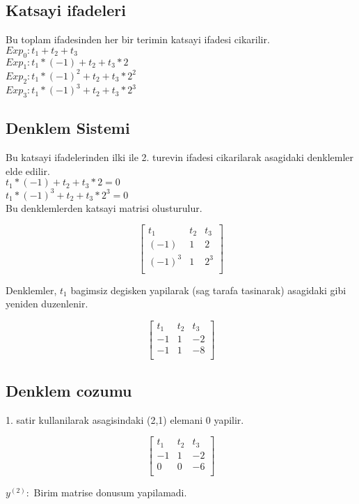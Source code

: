 \documentclass{article}
\begin{document}
\subsection{Katsayi ifadeleri}
Bu toplam ifadesinden her bir terimin katsayi ifadesi cikarilir.\\
$\displaystyle Exp_{0}: t_{1}+t_{2}+t_{3}$\\
$\displaystyle Exp_{1}: t_{1}*(-1)+t_{2}+t_{3}*2$\\
$\displaystyle Exp_{2}: t_{1}*(-1)^{2}+t_{2}+t_{3}*2^{2}$\\
$\displaystyle Exp_{3}: t_{1}*(-1)^{3}+t_{2}+t_{3}*2^{3}$\\
\subsection{Denklem Sistemi}
Bu katsayi ifadelerinden ilki ile 2. turevin ifadesi cikarilarak asagidaki denklemler elde edilir.\\
$\displaystyle t_{1}*(-1)+t_{2}+t_{3}*2=0$\\
$\displaystyle t_{1}*(-1)^{3}+t_{2}+t_{3}*2^{3}=0$\\
Bu denklemlerden katsayi matrisi olusturulur.
\begin{center}
$$ \left[\begin{array}{rrr}
t_{1} & t_{2} & t_{3}\\
(-1) & 1 & 2\\
(-1)^{3} & 1 & 2^{3}\\
\end{array}\right] $$
\end{center}
Denklemler, $t_{1}$ bagimsiz degisken yapilarak (sag tarafa tasinarak) asagidaki gibi yeniden duzenlenir.\\
\begin{center}
$$ \left[\begin{array}{rr|r}
t_{1} & t_{2} & t_{3}\\
-1 & 1 & -2\\
-1 & 1 & -8\\
\end{array}\right] $$
\end{center}
\subsection{Denklem cozumu}
1. satir kullanilarak  asagisindaki (2,1) elemani 0 yapilir.\begin{center}
$$ \left[\begin{array}{rr|r}
t_{1} & t_{2} & t_{3}\\
-1 & 1 & -2\\
0 & 0 & -6\\
\end{array}\right] $$
\end{center}
$y^{(2)}:$ Birim matrise donusum yapilamadi.\\
\end{document}
